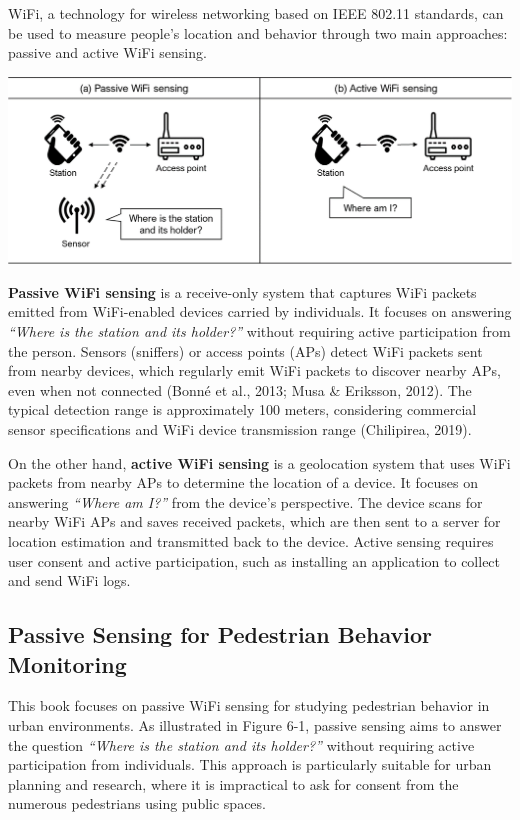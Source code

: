 \documentclass[
  letterpaper,
]{scrbook}
\begin{document}
WiFi, a technology for wireless networking based on IEEE 802.11
standards, can be used to measure people's location and behavior through
two main approaches: passive and active WiFi sensing.

\includegraphics{content/material/ch3/wifi-sensing-types.png}

\textbf{Passive WiFi sensing} is a receive-only system that captures
WiFi packets emitted from WiFi-enabled devices carried by individuals.
It focuses on answering \emph{``Where is the station and its holder?''}
without requiring active participation from the person. Sensors
(sniffers) or access points (APs) detect WiFi packets sent from nearby
devices, which regularly emit WiFi packets to discover nearby APs, even
when not connected (Bonné et al., 2013; Musa \& Eriksson, 2012). The
typical detection range is approximately 100 meters, considering
commercial sensor specifications and WiFi device transmission range
(Chilipirea, 2019).

On the other hand, \textbf{active WiFi sensing} is a geolocation system
that uses WiFi packets from nearby APs to determine the location of a
device. It focuses on answering \emph{``Where am I?''} from the device's
perspective. The device scans for nearby WiFi APs and saves received
packets, which are then sent to a server for location estimation and
transmitted back to the device. Active sensing requires user consent and
active participation, such as installing an application to collect and
send WiFi logs.

\hypertarget{passive-sensing-for-pedestrian-behavior-monitoring}{%
\subsection*{Passive Sensing for Pedestrian Behavior
Monitoring}\label{passive-sensing-for-pedestrian-behavior-monitoring}}

This book focuses on passive WiFi sensing for studying pedestrian
behavior in urban environments. As illustrated in Figure 6-1, passive
sensing aims to answer the question \emph{``Where is the station and its
holder?''} without requiring active participation from individuals. This
approach is particularly suitable for urban planning and research, where
it is impractical to ask for consent from the numerous pedestrians using
public spaces.
\end{document}

